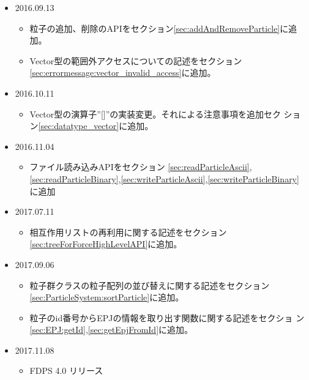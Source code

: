 \begin{itemize}
  \item 2016.09.13
  \begin{itemize}
  \item 粒子の追加、削除のAPIをセクション\ref{sec:addAndRemoveParticle}に追加。
  \item Vector型の範囲外アクセスについての記述をセクション
    \ref{sec:errormessage:vector_invalid_access}に追加。
  \end{itemize}

    \item 2016.10.11
  \begin{itemize}
  \item Vector型の演算子''[]''の実装変更。それによる注意事項を追加セク
    ション\ref{sec:datatype_vector}に追加。
  \end{itemize}

  \item 2016.11.04
  \begin{itemize}
  \item ファイル読み込みAPIをセクション
    \ref{sec:readParticleAscii},\ref{sec:readParticleBinary},\ref{sec:writeParticleAscii},\ref{sec:writeParticleBinary}
    に追加
  \end{itemize}

    \item 2017.07.11
  \begin{itemize}
  \item 相互作用リストの再利用に関する記述をセクション
    \ref{sec:treeForForceHighLevelAPI}に追加。
  \end{itemize}

    \item 2017.09.06
  \begin{itemize}
  \item 粒子群クラスの粒子配列の並び替えに関する記述をセクション
    \ref{sec:ParticleSystem:sortParticle}に追加。
  \item 粒子のid番号からEPJの情報を取り出す関数に関する記述をセクショ
    ン\ref{sec:EPJ:getId},\ref{sec:getEpjFromId}に追加。
  \end{itemize}

  \item 2017.11.08
    \begin{itemize}
    \item FDPS 4.0 リリース
    \end{itemize}


\end{itemize}
